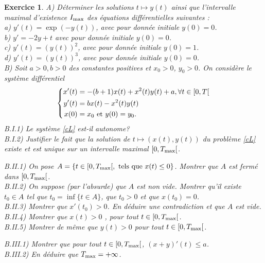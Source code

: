 \documentclass[11pt]{article}
\theoremstyle{exostyle}
\newtheorem{exercice}{Exercice}
\begin{document}
\begin{exercice}
  A) D\'eterminer les solutions $t\mapsto y(t)$ ainsi que l'intervalle maximal d'existence $I_{\rm max}$ des équations différentielles suivantes : \\
  a) $y'(t)=\exp(-y(t))$, avec  pour donn\'ee initiale $y(0)=0$.  \\
  b)    $y'= - {2y}+t$ avec pour donn\'ee initiale $y(0)=0$.\\
  c) $y'(t)=(y(t))^2$, avec  pour donn\'ee initiale $y(0)=1$.  \\
  d) $y'(t)=(y(t))^3$, avec  pour donn\'ee initiale $y(0)=0$.  \\



  \bigskip
  \noindent
  B) Soit $a>0, b>0$ des constantes positives et $x_0>0$, $y_0>0$. On considère 
  le système différentiel
  \begin{equation}
    \label{cL}
    \left\{
      \begin{aligned}
        x'(t)&=-(b+1) x(t)+x^2(t)y(t)+a, \forall t\in [0, T[ \\
        y'(t)&=b x(t)-x^2(t) y(t)  \\
        x(0)&=x_0 {\rm \ et \ }  y(0)=y_0. 
      \end{aligned}
    \right. 
  \end{equation} 
  B.I.1) Le système \eqref{cL} est-il autonome? \\
  B.I.2) Justifier le fait que la solution de $t\mapsto (x(t), y(t))$ du problème \eqref{cL} existe et est unique  sur un intervalle maximal $[0, T_{\rm max}[$.

  \medskip
  \noindent
  B.II.1) On  pose $A=\{t  \in [0,  T_{\rm  max}[, {\rm \ tels  \ que \ } x(t) \leq 0\}$. Montrer que $A$ est ferm\'e dans $[0, T_{\rm max}[$. \\
  B.II.2) On suppose ({\it par l'absurde})  que $A$ est non vide. Montrer  qu'il existe $t_0\in A$ tel que
  $t_0=\inf\{t \in A\}$,  que $t_0>0$ et que $x(t_0)=0$. \\
  B.II.3) Montrer que $x'(t_0)>0$.  En d\'eduire une contradiction et que $A$ est vide. \\
  B.II.4) Montrer que $x(t)>0$ , pour tout $t\in [0, T_{\rm max}[$. \\
  B.II.5) Montrer de m\^eme que $y(t)>0$ pour tout $t \in [0, T_{\rm max}[$. 

  \medskip
  \noindent
  B.III.1) Montrer que pour tout $t \in [0, T_{\rm max}[$,  $(x+y)'(t)\leq a$. \\
  B.III.2) En d\'eduire que $T_{\rm max}=+\infty$. 


\end{exercice}
\end{document}
